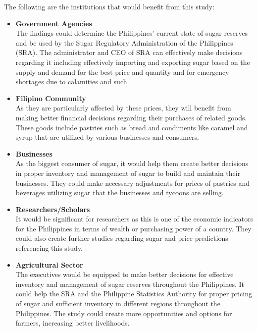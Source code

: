 \documentclass[11pt]{article}
\begin{document}
\noindent The following are the institutions that would benefit from this study:

\begin{itemize}
    \item \textbf{Government Agencies}\\
    The findings could determine the Philippines’ current state of sugar reserves and be used by the Sugar Regulatory Administration of the Philippines (SRA). The administrator and CEO of SRA can effectively make decisions regarding it including effectively importing and exporting sugar based on the supply and demand for the best price and quantity and for emergency shortages due to calamities and such.
    \item \textbf{Filipino Community}\\
	As they are particularly affected by these prices, they will benefit from making better financial decisions regarding their purchases of related goods. These goods include pastries such as bread and condiments like caramel and syrup that are utilized by various businesses and consumers.

    \item \textbf{Businesses}\\
    As the biggest consumer of sugar, it would help them create better decisions in proper inventory and management of sugar to build and maintain their businesses. They could make necessary adjustments for prices of pastries and beverages utilizing sugar that the businesses and tycoons are selling.

    \item \textbf{Researchers/Scholars}\\
	It would be significant for researchers as this is one of the economic indicators for the Philippines in terms of wealth or purchasing power of a country. They could also create further studies regarding sugar and price predictions referencing this study.

    \item \textbf{Agricultural Sector}\\
	The executives would be equipped to make better decisions for effective inventory and management of sugar reserves throughout the Philippines. It could help the SRA and the Philippine Statistics Authority for proper pricing of sugar and sufficient inventory in different regions throughout the Philippines. The study could create more opportunities and options for farmers, increasing better livelihoods.
\end{itemize}
\end{document}
